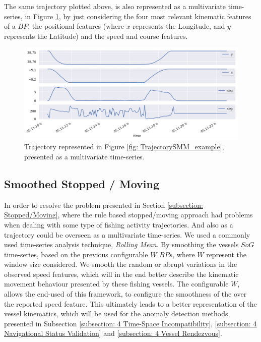 The same trajectory plotted above, is also represented as a multivariate time-series, in Figure \ref{fig: MTimeSeries_example}, by just considering the four most relevant kinematic features of a $BP$, the positional features (where $x$ represents the Longitude, and $y$ represents the Latitude) and the speed and course features. 


\begin{figure}[H]
	\centering
	\includegraphics[scale = .52]{figures/Ch3/ts_example.png}
    \caption{Trajectory represented in Figure \ref{fig: TrajectorySMM_example}, presented as a multivariate time-series.}
    \label{fig: MTimeSeries_example}
\end{figure}

\subsection{Smoothed Stopped / Moving}
\label{subsection: Smoothed Stopped / Moving}
In order to resolve the problem presented in Section \ref{subsection: Stopped/Moving}, where the rule based stopped/moving approach had problems when dealing with some type of fishing activity trajectories. 
And also as a trajectory could be overseen as a multivariate time-series. We used a commonly used time-series analysis technique, \emph{Rolling Mean}. 
By smoothing the vessels $SoG$ time-series, based on the previous configurable $W$ $BPs$, where $W$ represent the window size considered. We smooth the random or abrupt variations in the observed speed features, which will in the end better describe the kinematic movement behaviour presented by these fishing vessels. 
The configurable $W$, allows the end-used of this framework, to configure the smoothness of the over the reported speed feature. This ultimately leads to a better representation of the vessel kinematics, which will be used for the anomaly detection methods presented in Subsection \ref{subsection: 4 Time-Space Incompatibility}, \ref{subsection: 4 Navigational Status Validation} and \ref{subsection: 4 Vessel Rendezvous}.

